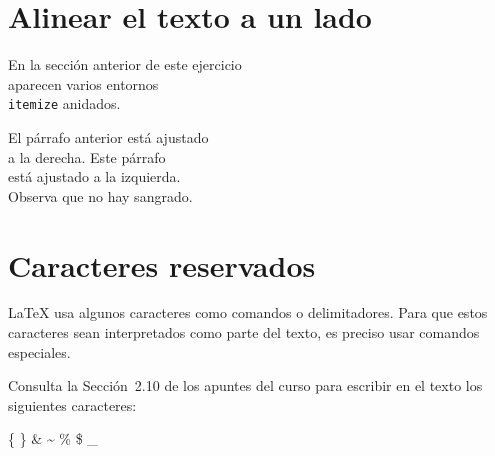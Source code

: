 \documentclass[a4paper,twocolumn]{report}
\begin{document}
\section*{Alinear el texto a un lado}

\begin{flushright}
\noindent
En la sección anterior de este ejercicio \\
aparecen varios entornos \\
\texttt{itemize} anidados.
\end{flushright}

\begin{flushleft}
\noindent
El párrafo anterior está ajustado \\
a la derecha. Este párrafo \\
está ajustado a la izquierda. \\
Observa que no hay sangrado. 
\end{flushleft}


\section*{Caracteres reservados}


\LaTeX{} usa algunos caracteres como comandos o delimitadores. Para que estos caracteres sean interpretados como parte del texto,  es preciso usar comandos especiales. 


Consulta la Sección~2.10 de los apuntes del curso para escribir en el texto los siguientes caracteres: 

\centerline{\{ \} \& \~{} \% \$ \_}
\end{document}

